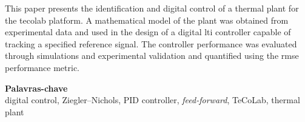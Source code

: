 \begin{resumo}
This paper presents the identification and digital control of a thermal plant for the \gls{tecolab} platform. A mathematical model of the plant was obtained from experimental data and used in the design of a digital \gls{lti} controller capable of tracking a specified reference signal. The controller performance was evaluated through simulations and experimental validation and quantified using the \gls{rmse} performance metric.
\end{resumo}
{\small
\begin{center}
{\bfseries Palavras-chave}\\
digital control, Ziegler--Nichols, PID controller, \textit{feed-forward}, TeCoLab, thermal plant
\end{center}
}